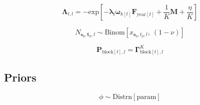\documentclass{article}
\begin{document}

\begin{equation}
  \label{eq:model-survival}
    \boldsymbol{\Lambda}_{t,l} = 
    - \mathrm{exp} \! \left[ -
    \boldsymbol{\lambda}_{l} \boldsymbol{\omega}_{k[t]}  
    \boldsymbol{F}_{\mathrm{year}[t]} + \frac{1}{K} \boldsymbol{M} + \frac{\eta}{K} \right]
\end{equation}


\begin{equation}
  \label{eq:model-release}
  N_{\boldsymbol{s}_{0},\boldsymbol{t}_{0},l} \sim 
    \mathrm{Binom} \! \left[ x_{\boldsymbol{s}_{0},t_{0},l} \mathrm{,} \: \left( 1 - \nu \right) \right]
\end{equation}

\begin{equation}
  \label{eq:model-movement}
  \boldsymbol{P}_{\mathrm{block}[t],l} = \boldsymbol{\Gamma}^{K}_{\mathrm{block}[t],l}
\end{equation}



\subsection{Priors}

\begin{equation}
  \label{eq:prior-dispersion}
  \phi \sim \mathrm{Distrn} \! \left[ \mathrm{param} \right]
\end{equation}
\end{document}
